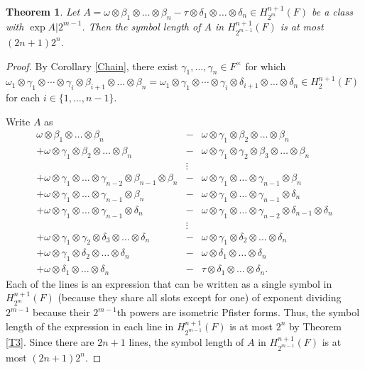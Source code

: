 \documentclass[preprint, 10pt, english]{elsarticle}
\newtheorem{thm}{Theorem}[section] %
\theoremstyle{definition}
\begin{document}
\begin{thm}\label{T5}
Let $A=\omega\otimes\beta_1\otimes\dots\otimes\beta_n-\tau\otimes \delta_1\otimes \dots\otimes \delta_n \in H_{2^m}^{n+1}(F)$ be a class with $\exp A|2^{m-1}$. Then the symbol length of $A$ in $H_{2^{m-1}}^{n+1}(F)$ is at most $(2n+1)2^n$. 
\end{thm}

\begin{proof}
By Corollary \ref{Chain}, there exist $\gamma_1,\dots,\gamma_n \in F^\times$ for which $\omega_1 \otimes \gamma_1\otimes \cdots \otimes \gamma_i \otimes \beta_{i+1} \otimes \dots \otimes \beta_n=\omega_1 \otimes \gamma_1 \otimes \cdots \otimes \gamma_i \otimes \delta_{i+1} \otimes \dots \otimes \delta_n \in H^{n+1}_2(F)$ for each $i\in \{1,\dots,n-1\}$.

Write $A$ as 
\begin{eqnarray*}
\omega\otimes\beta_1\otimes\dots\otimes\beta_n &-& \omega\otimes \gamma_1 \otimes \beta_2 \otimes \dots\otimes \beta_n \\
+\omega\otimes \gamma_1 \otimes \beta_2 \otimes \dots\otimes \beta_n&-&\omega\otimes \gamma_1 \otimes \gamma_2 \otimes \beta_3 \otimes \dots\otimes \beta_n\\
&\vdots& \\
+\omega\otimes \gamma_1 \otimes \dots \otimes \gamma_{n-2}  \otimes \beta_{n-1} \otimes \beta_n&-&\omega\otimes \gamma_1 \otimes \dots \otimes \gamma_{n-1} \otimes \beta_n\\
+\omega\otimes \gamma_1 \otimes \dots \otimes \gamma_{n-1} \otimes \beta_n & - & \omega\otimes \gamma_1 \otimes \dots \otimes \gamma_{n-1} \otimes \delta_n\\
+\omega\otimes \gamma_1 \otimes \dots \otimes \gamma_{n-1} \otimes \delta_n& -& \omega\otimes \gamma_1 \otimes \dots \otimes \gamma_{n-2}  \otimes \delta_{n-1} \otimes \delta_n\\
& \vdots &\\
+\omega\otimes \gamma_1 \otimes \gamma_2 \otimes \delta_3 \otimes \dots\otimes \delta_n &-& \omega\otimes \gamma_1 \otimes \delta_2 \otimes \dots\otimes \delta_n\\
+\omega\otimes \gamma_1 \otimes \delta_2 \otimes \dots\otimes \delta_n &-&\omega\otimes \delta_1 \otimes \dots\otimes \delta_n\\
+\omega\otimes \delta_1 \otimes \dots\otimes \delta_n &-&\tau\otimes \delta_1 \otimes \dots\otimes \delta_n.
\end{eqnarray*}
Each of the lines is an expression that can be written as a single symbol in $H_{2^m}^{n+1}(F)$ (because they share all slots except for one) of exponent dividing $2^{m-1}$ because their $2^{m-1}$th powers are isometric Pfister forms. Thus, the symbol length of the expression in each line in $H_{2^{m-1}}^{n+1}(F)$ is at most $2^n$ by Theorem \ref{T3}. Since there are $2n+1$ lines, the symbol length of $A$ in $H_{2^{m-1}}^{n+1}(F)$ is at most $(2n+1)2^n$.
\end{proof}



\end{document}
